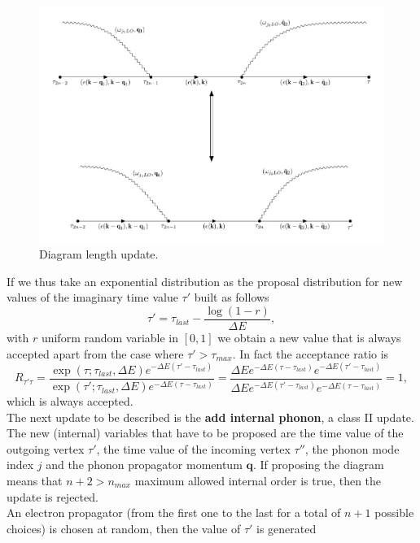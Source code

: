 \begin{figure}[H]
    \centering
    \includegraphics[scale=0.6]{diagram_length_v2.pdf}
    \caption{Diagram length update.}
    \label{fig:length_update}
\end{figure}
If we thus take an exponential distribution as the proposal distribution for new values of the imaginary time value $\tau'$ built as follows
\begin{equation}
    \tau'=\tau_{last}-\frac{\log{\left(1-r\right)}}{\Delta E},
\end{equation}
with $r$ uniform random variable in $[0,1]$ we obtain a new value that is always accepted apart from the case where $\tau'>\tau_{max}$. In fact the acceptance ratio is
\begin{equation}
    R_{\tau'\tau}=\frac{\exp{\left(\tau;\tau_{last},\Delta E\right)}e^{-\Delta E(\tau'-\tau_{last})}}{\exp{\left(\tau';\tau_{last},\Delta E\right)}e^{-\Delta E (\tau-\tau_{last})}}=\frac{\Delta E e^{-\Delta E(\tau-\tau_{last})}e^{-\Delta E (\tau'-\tau_{last})}}{\Delta E e^{-\Delta E(\tau'-\tau_{last})}e^{-\Delta E (\tau-\tau_{last})}}=1,
\end{equation}
which is always accepted.\\
The next update to be described is the \textbf{add internal phonon}, a class II update. The new (internal) variables that have to be proposed 
are the time value of the outgoing vertex $\tau'$, the time value of the incoming vertex $\tau''$, the phonon mode index $j$ and the phonon propagator 
momentum $\mathbf{q}$. If proposing the diagram means that $n+2>n_{max}$ maximum allowed internal order is true, then the update is rejected.\\
An electron propagator (from the first one to the last for a total of $n+1$ possible choices) is chosen at random, then the value of $\tau'$ is generated 

